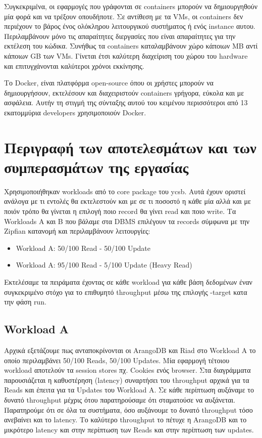 \documentclass[conference]{IEEEtran}
\begin{document}
Συγκεκριμένα, οι εφαρμογές που γράφονται σε containers μπορούν να δημιουργηθούν μία φορά και να τρέξουν οπουδήποτε. Σε αντίθεση με τα VMs, οι containers δεν περιέχουν το βάρος ένος ολόκληρου λειτουργικού συστήματος ή ενός instance αυτου. Περιλαμβάνουν μόνο τις απαραίτητες διεργασίες που είναι απαραίτητες για την εκτέλεση του κώδικα. Συνήθως τα containers καταλαμβάνουν χώρο κάποιων MB αντί κάποιων GB των VMs. Γίνεται έτσι καλύτερη διαχείριση του χώρου του hardware και επιτυγχάνονται καλύτεροι χρόνοι εκκίνησης.

Το Docker, είναι πλατφόρμα open-source όπου οι χρήστες μπορούν να δημιουργήσουν, εκτελέσουν και διαχειριστούν containers γρήγορα, εύκολα και με ασφάλεια. Αυτήν τη στιγμή της σύνταξης αυτού του κειμένου περισσότεροι από 13 εκατομμύρια developers χρησιμοποιούν Docker.



\section{Περιγραφή των αποτελεσμάτων και των συμπερασμάτων της εργασίας}

Χρησιμοποιήθηκαν workloads από το core package του ycsb. Αυτά έχουν οριστεί ανάλογα με τι εντολές θα εκτελεστούν και με σε τι ποσοστό η κάθε μία αλλά και με ποιόν τρόπο θα γίνεται η επιλογή ποιο record θα γίνει read και ποιο write. Τα Workloads Α και B που βάλαμε στα DBMS επιλέγουν τα records σύμφωνα με την Zipfian κατανομή και περιλαμβάνουν λειτουργίες:
\begin{itemize}
\item 
Workload A: 50/100 Read - 50/100 Update
\item 
Workload A: 95/100 Read - 5/100 Update (Heavy Read)
\end{itemize}


Εκτελέσαμε τα πειράματα έχοντας σε κάθε workload για κάθε βάση δεδομένων έναν συγκεκριμένο στόχο για το επιθυμητό throughput μέσω της επιλογής -target κατα την φάση run. 

\subsection{Workload A}    

Αρχικά εξετάζουμε πως ανταποκρίνονται οι ArangoDB και Riad στο Workload A το οποίο περιλαμβάνει 50/100 Reads, 50/100 Updates.  Μία εφαρμογή τέτοιου workload αποτελούν τα session stores πχ. Cookies ενός browser.  Στα διαγράμματα παρουσιάζεται η καθυστέρηση (latency) συναρτήσει του throughput αρχικά για τα Reads και έπειτα για τα  Updates του Workload A. Σε κάθε περίπτωση αυξάναμε το δυνατό throughput μέχρις ότου παρατηρούσαμε ότι σταματούσε να αυξάνεται. Παρατηρούμε ότι σε όλα τα συστήματα, όσο αυξάνουμε το δυνατό throughput τόσο ανεβαίνει και το latency. Το καλύτερο throughput το πέτυχε η ArangoDB και το μικρότερο latency και στην περίπτωση των Reads και στην περίπτωση των updates. 
\end{document}
